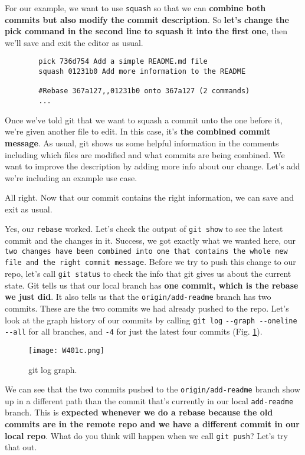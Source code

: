 	For our example, we want to use \texttt{squash} so that we can \textbf{combine both commits but also modify the commit description}. So \textbf{let's change the pick command in the second line to squash it into the first one}, then we'll save and exit the editor as usual.
	
	\begin{verbatim}
		pick 736d754 Add a simple README.md file
		squash 01231b0 Add more information to the README
		
		#Rebase 367a127,,01231b0 onto 367a127 (2 commands)
		... 
	\end{verbatim}
	
	Once we've told git that we want to squash a commit unto the one before it, we're given another file to edit. In this case, it's \textbf{the combined commit message}. As usual, git shows us some helpful information in the comments including which files are modified and what commits are being combined. We want to improve the description by adding more info about our change. Let's add we're including an example use case.
	
	All right. Now that our commit contains the right information, we can save and exit as usual.
	
	Yes, our \texttt{rebase} worked. Let's check the output of \texttt{git show} to see the latest commit and the changes in it. Success, we got exactly what we wanted here, our \texttt{two changes have been combined into one that contains the whole new file and the right commit message}. Before we try to push this change to our repo, let's call \texttt{git status} to check the info that git gives us about the current state. Git tells us that our local branch has \textbf{one commit, which is the rebase we just did}. It also tells us that the \verb|origin/add-readme| branch has two commits. These are the two commits we had already pushed to the repo. Let's look at the graph history of our commits by calling \texttt{git log} \verb|--graph --oneline --all| for all branches, and \verb|-4| for just the latest four commits (Fig. \ref{W401c}). 
	
	\begin{figure} 
		\caption{git log graph.}
		\centering
		\texttt{[image: W401c.png]}
		\label{W401c}
	\end{figure}

	We can see that the two commits pushed to the \verb|origin/add-readme| branch show up in a different path than the commit that's currently in our local \verb|add-readme| branch. This is \textbf{expected whenever we do a rebase because the old commits are in the remote repo and we have a different commit in our local repo}. What do you think will happen when we call \texttt{git push}? Let's try that out.
	

